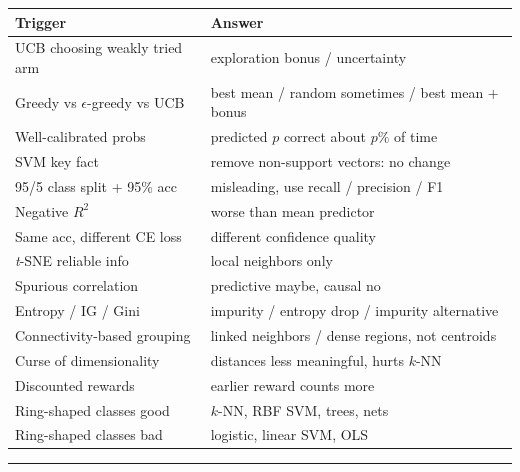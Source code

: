 \documentclass[11pt,landscape]{article}
\begin{document}
	\begin{minipage}[t]{0.495\textwidth}
		\centering
		\begin{tabularx}{\linewidth}{@{}L{1.58in}L{2.88in}@{}}
			\toprule
			\textbf{Trigger} & \textbf{Answer} \\
			\midrule
			UCB choosing weakly tried arm & exploration bonus / uncertainty \\
			Greedy vs $\epsilon$-greedy vs UCB & best mean / random sometimes / best mean + bonus \\
			Well-calibrated probs & predicted $p$ correct about $p\%$ of time \\
			SVM key fact & remove non-support vectors: no change \\
			95/5 class split + 95\% acc & misleading, use recall / precision / F1 \\
			Negative $R^2$ & worse than mean predictor \\
			Same acc, different CE loss & different confidence quality \\
			\textit{t}-SNE reliable info & local neighbors only \\
			Spurious correlation & predictive maybe, causal no \\
			Entropy / IG / Gini & impurity / entropy drop / impurity alternative \\
			Connectivity-based grouping & linked neighbors / dense regions, not centroids \\
			Curse of dimensionality & distances less meaningful, hurts $k$-NN \\
			Discounted rewards & earlier reward counts more \\
			Ring-shaped classes good & $k$-NN, RBF SVM, trees, nets \\
			Ring-shaped classes bad & logistic, linear SVM, OLS \\
			\bottomrule
		\end{tabularx}
	\end{minipage}
	
	\vspace{0.18em}
	\hrule
	\vspace{0.12em}
	
\end{document}
